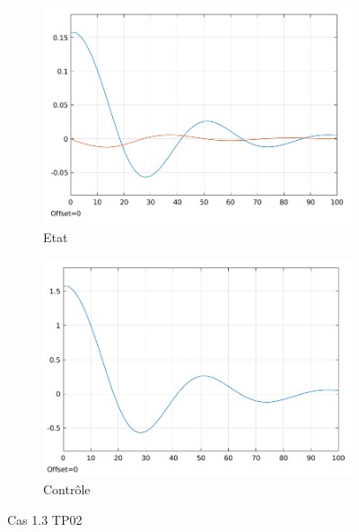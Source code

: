 \documentclass[a4paper]{article}
\begin{document}
                        \begin{figure}[h!]
                                \centering
                                \begin{subfigure}[b]{0.45\textwidth}
                                        \includegraphics[width=\textwidth]{images/courbe_cas_1_3_TP02.png}
                                        \caption{Etat}
                                        \label{fig_cas_1.3_TP02_etats}
                                \end{subfigure}
                                \hspace{30pt}
                                \begin{subfigure}[b]{0.45\textwidth}
                                        \includegraphics[width=\textwidth]{images/controle_cas_1_3_TP02.png}
                                        \caption{Contrôle}
                                        \label{fig_cas_1.3_TP02_controle}
                                \end{subfigure}
                                \caption{Cas 1.3 TP02}
                                \label{fig_cas_1.3_TP02}
                        \end{figure}
\end{document}
